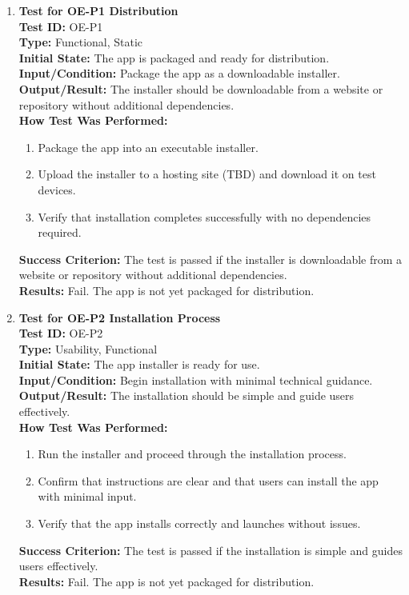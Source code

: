 \documentclass[12pt, titlepage]{article}
\begin{document}
\begin{enumerate}
    \item \textbf{Test for OE-P1 Distribution} \\
      \newline
      \textbf{Test ID:} OE-P1 \\
      \textbf{Type:} Functional, Static \\
      \textbf{Initial State:} The app is packaged and ready for distribution. \\
      \textbf{Input/Condition:} Package the app as a downloadable installer. \\
      \textbf{Output/Result:} The installer should be downloadable from a website or repository without additional dependencies. \\
      \textbf{How Test Was Performed:}
      \begin{enumerate}
          \item Package the app into an executable installer.
          \item Upload the installer to a hosting site (TBD) and download it on test devices.
          \item Verify that installation completes successfully with no dependencies required.
      \end{enumerate}
      \textbf{Success Criterion:} The test is passed if the installer is downloadable from a website or repository without additional dependencies.\\
      \textbf{Results:} Fail. The app is not yet packaged for distribution.\\

    \item \textbf{Test for OE-P2 Installation Process} \\
      \newline
      \textbf{Test ID:} OE-P2 \\
      \textbf{Type:} Usability, Functional \\
      \textbf{Initial State:} The app installer is ready for use. \\
      \textbf{Input/Condition:} Begin installation with minimal technical guidance. \\
      \textbf{Output/Result:} The installation should be simple and guide users effectively. \\
      \textbf{How Test Was Performed:}
      \begin{enumerate}
          \item Run the installer and proceed through the installation process.
          \item Confirm that instructions are clear and that users can install the app with minimal input.
          \item Verify that the app installs correctly and launches without issues.
      \end{enumerate}
      \textbf{Success Criterion:} The test is passed if the installation is simple and guides users effectively.\\
      \textbf{Results:} Fail. The app is not yet packaged for distribution.\\


\end{enumerate}
\end{document}
